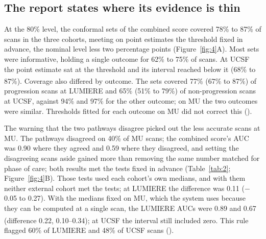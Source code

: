 \documentclass[largeformat]{interact} %
\newcommand{\expl}{\textsuperscript{\textdagger}}
\begin{document}
\subsection{The report states where its evidence is thin}\label{sec:3.4}

At the 80\% level, the conformal sets of the combined score covered 78\% to 87\% of scans in the three cohorts,
meeting on point estimates the threshold fixed in advance, the nominal level less two percentage points
(Figure~\ref{fig:4}A). Most sets were informative, holding a single outcome for 62\% to 75\% of scans. At UCSF the
point estimate sat at the threshold and its interval reached below it (68\% to 87\%). Coverage also differed by outcome\expl. The sets covered 77\%
(67\% to 87\%) of progression scans at LUMIERE and 65\% (51\% to 79\%) of non-progression scans at UCSF, against
94\% and 97\% for the other outcome; on MU the two outcomes were similar. Thresholds fitted for each outcome on MU did
not correct this ().

The warning that the two pathways disagree picked out the less accurate scans at MU. The pathways disagreed on 40\%
of MU scans; the combined score's AUC was 0.90 where they agreed and 0.59 where they disagreed, and setting the
disagreeing scans aside gained more than removing the same number matched for phase of care; both results met the
tests fixed in advance (Table~\ref{tab:2}; Figure~\ref{fig:4}B). Those tests used each cohort's own medians, and with
them neither external cohort met the tests; at LUMIERE the difference was 0.11 ($-$0.05 to 0.27). With the medians fixed on MU,
which the system uses because they can be computed at a single scan, the LUMIERE AUCs were 0.89 and 0.67 (difference
0.22, 0.10--0.34)\expl; at UCSF the interval still included zero. This rule flagged 60\% of LUMIERE and 48\% of UCSF
scans ().
\end{document}
